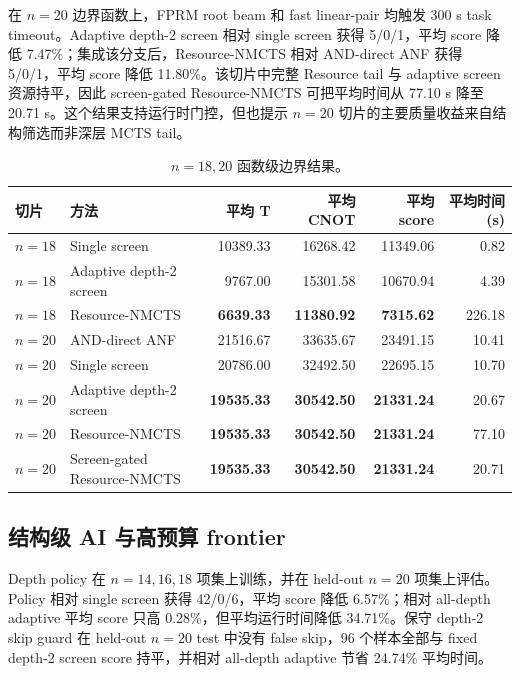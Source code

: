 \documentclass[UTF8,fontset=macnew,11pt]{ctexart}
\newcommand{\method}{Resource-NMCTS}
\newcommand{\mcts}{\ensuremath{\mathrm{MCTS}}}
\begin{document}
在 $n=20$ 边界函数上，FPRM root beam 和 fast linear-pair 均触发 300 s task timeout。Adaptive depth-2 screen 相对 single screen 获得 5/0/1，平均 score 降低 7.47\%；集成该分支后，\method{} 相对 AND-direct ANF 获得 5/0/1，平均 score 降低 11.80\%。该切片中完整 Resource tail 与 adaptive screen 资源持平，因此 screen-gated \method{} 可把平均时间从 77.10 s 降至 20.71 s。这个结果支持运行时门控，但也提示 $n=20$ 切片的主要质量收益来自结构筛选而非深层 \mcts{} tail。

\begin{table}[H]
\centering
\scriptsize
\caption{$n=18,20$ 函数级边界结果。}
\label{tab:highdim}
\begin{tabular}{llrrrr}
\toprule
切片 & 方法 & 平均 T & 平均 CNOT & 平均 score & 平均时间(s) \\
\midrule
$n=18$ & Single screen & 10389.33 & 16268.42 & 11349.06 & 0.82 \\
$n=18$ & Adaptive depth-2 screen & 9767.00 & 15301.58 & 10670.94 & 4.39 \\
$n=18$ & \method{} & \textbf{6639.33} & \textbf{11380.92} & \textbf{7315.62} & 226.18 \\
$n=20$ & AND-direct ANF & 21516.67 & 33635.67 & 23491.15 & 10.41 \\
$n=20$ & Single screen & 20786.00 & 32492.50 & 22695.15 & 10.70 \\
$n=20$ & Adaptive depth-2 screen & \textbf{19535.33} & \textbf{30542.50} & \textbf{21331.24} & 20.67 \\
$n=20$ & \method{} & \textbf{19535.33} & \textbf{30542.50} & \textbf{21331.24} & 77.10 \\
$n=20$ & Screen-gated \method{} & \textbf{19535.33} & \textbf{30542.50} & \textbf{21331.24} & 20.71 \\
\bottomrule
\end{tabular}
\end{table}

\subsection{结构级 AI 与高预算 frontier}

Depth policy 在 $n=14,16,18$ 项集上训练，并在 held-out $n=20$ 项集上评估。Policy 相对 single screen 获得 42/0/6，平均 score 降低 6.57\%；相对 all-depth adaptive 平均 score 只高 0.28\%，但平均运行时间降低 34.71\%。保守 depth-2 skip guard 在 held-out $n=20$ test 中没有 false skip，96 个样本全部与 fixed depth-2 screen score 持平，并相对 all-depth adaptive 节省 24.74\% 平均时间。
\end{document}
